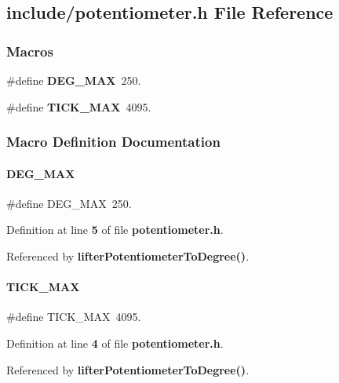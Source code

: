 \subsection{include/potentiometer.h File Reference}
\label{potentiometer_8h}
\subsubsection*{Macros}
\begin{DoxyCompactItemize}
\item 
\#define \textbf{ D\+E\+G\+\_\+\+M\+AX}~250.
\item 
\#define \textbf{ T\+I\+C\+K\+\_\+\+M\+AX}~4095.
\end{DoxyCompactItemize}


\subsubsection{Macro Definition Documentation}
\mbox{\label{potentiometer_8h_ab77b81696cf83be632fca5f56b4c3595}} 
\paragraph{D\+E\+G\+\_\+\+M\+AX}
{\footnotesize\ttfamily \#define D\+E\+G\+\_\+\+M\+AX~250.}



Definition at line \textbf{ 5} of file \textbf{ potentiometer.\+h}.



Referenced by \textbf{ lifter\+Potentiometer\+To\+Degree()}.

\mbox{\label{potentiometer_8h_ad40f2bbc4e57baed2d9e900750d94a7f}} 
\paragraph{T\+I\+C\+K\+\_\+\+M\+AX}
{\footnotesize\ttfamily \#define T\+I\+C\+K\+\_\+\+M\+AX~4095.}



Definition at line \textbf{ 4} of file \textbf{ potentiometer.\+h}.



Referenced by \textbf{ lifter\+Potentiometer\+To\+Degree()}.

